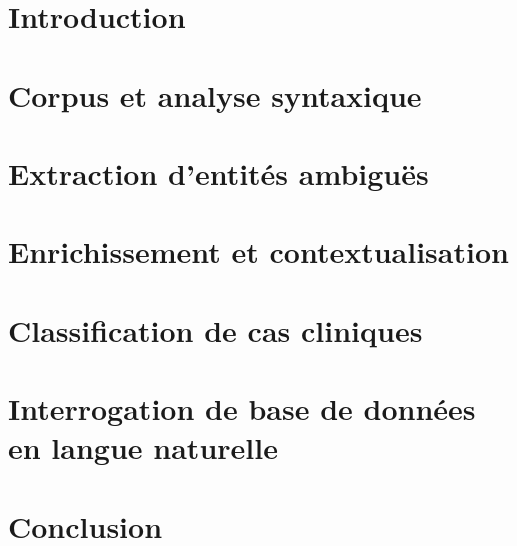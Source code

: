 \section{Introduction}
\label{sec:tal:intro}


\section{Corpus et analyse syntaxique}
\label{sec:tal:syntax}


\section{Extraction d'entités ambiguës}
\label{sec:tal:entity}


\section{Enrichissement et contextualisation}
\label{sec:tal:ctx}


\pagebreak
\section{Classification de cas cliniques}
\label{sec:tal:classification}


\section{Interrogation de base de données en langue naturelle}
\label{sec:tal:nl-query}


\section{Conclusion}
\label{sec:tal:conclusion}

